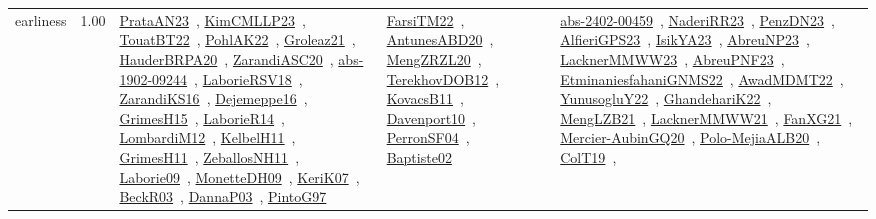 {\begin{longtable}{p{3cm}r>{\raggedright\arraybackslash}p{6cm}>{\raggedright\arraybackslash}p{6cm}>{\raggedright\arraybackslash}p{8cm}}
\index{earliness}\index{Concepts!earliness}earliness &  1.00 & \href{../works/PrataAN23.pdf}{PrataAN23}~\cite{PrataAN23}, \href{../works/KimCMLLP23.pdf}{KimCMLLP23}~\cite{KimCMLLP23}, \href{../works/TouatBT22.pdf}{TouatBT22}~\cite{TouatBT22}, \href{../works/PohlAK22.pdf}{PohlAK22}~\cite{PohlAK22}, \href{../works/Groleaz21.pdf}{Groleaz21}~\cite{Groleaz21}, \href{../works/HauderBRPA20.pdf}{HauderBRPA20}~\cite{HauderBRPA20}, \href{../works/ZarandiASC20.pdf}{ZarandiASC20}~\cite{ZarandiASC20}, \href{../works/abs-1902-09244.pdf}{abs-1902-09244}~\cite{abs-1902-09244}, \href{../works/LaborieRSV18.pdf}{LaborieRSV18}~\cite{LaborieRSV18}, \href{../works/ZarandiKS16.pdf}{ZarandiKS16}~\cite{ZarandiKS16}, \href{../works/Dejemeppe16.pdf}{Dejemeppe16}~\cite{Dejemeppe16}, \href{../works/GrimesH15.pdf}{GrimesH15}~\cite{GrimesH15}, \href{../works/LaborieR14.pdf}{LaborieR14}~\cite{LaborieR14}, \href{../works/LombardiM12.pdf}{LombardiM12}~\cite{LombardiM12}, \href{../works/KelbelH11.pdf}{KelbelH11}~\cite{KelbelH11}, \href{../works/GrimesH11.pdf}{GrimesH11}~\cite{GrimesH11}, \href{../works/ZeballosNH11.pdf}{ZeballosNH11}~\cite{ZeballosNH11}, \href{../works/Laborie09.pdf}{Laborie09}~\cite{Laborie09}, \href{../works/MonetteDH09.pdf}{MonetteDH09}~\cite{MonetteDH09}, \href{../works/KeriK07.pdf}{KeriK07}~\cite{KeriK07}, \href{../works/BeckR03.pdf}{BeckR03}~\cite{BeckR03}, \href{../works/DannaP03.pdf}{DannaP03}~\cite{DannaP03}, \href{../works/PintoG97.pdf}{PintoG97}~\cite{PintoG97} & \href{../works/FarsiTM22.pdf}{FarsiTM22}~\cite{FarsiTM22}, \href{../works/AntunesABD20.pdf}{AntunesABD20}~\cite{AntunesABD20}, \href{../works/MengZRZL20.pdf}{MengZRZL20}~\cite{MengZRZL20}, \href{../works/TerekhovDOB12.pdf}{TerekhovDOB12}~\cite{TerekhovDOB12}, \href{../works/KovacsB11.pdf}{KovacsB11}~\cite{KovacsB11}, \href{../works/Davenport10.pdf}{Davenport10}~\cite{Davenport10}, \href{../works/PerronSF04.pdf}{PerronSF04}~\cite{PerronSF04}, \href{../works/Baptiste02.pdf}{Baptiste02}~\cite{Baptiste02} & \href{../works/abs-2402-00459.pdf}{abs-2402-00459}~\cite{abs-2402-00459}, \href{../works/NaderiRR23.pdf}{NaderiRR23}~\cite{NaderiRR23}, \href{../works/PenzDN23.pdf}{PenzDN23}~\cite{PenzDN23}, \href{../works/AlfieriGPS23.pdf}{AlfieriGPS23}~\cite{AlfieriGPS23}, \href{../works/IsikYA23.pdf}{IsikYA23}~\cite{IsikYA23}, \href{../works/AbreuNP23.pdf}{AbreuNP23}~\cite{AbreuNP23}, \href{../works/LacknerMMWW23.pdf}{LacknerMMWW23}~\cite{LacknerMMWW23}, \href{../works/AbreuPNF23.pdf}{AbreuPNF23}~\cite{AbreuPNF23}, \href{../works/EtminaniesfahaniGNMS22.pdf}{EtminaniesfahaniGNMS22}~\cite{EtminaniesfahaniGNMS22}, \href{../works/AwadMDMT22.pdf}{AwadMDMT22}~\cite{AwadMDMT22}, \href{../works/YunusogluY22.pdf}{YunusogluY22}~\cite{YunusogluY22}, \href{../works/GhandehariK22.pdf}{GhandehariK22}~\cite{GhandehariK22}, \href{../works/MengLZB21.pdf}{MengLZB21}~\cite{MengLZB21}, \href{../works/LacknerMMWW21.pdf}{LacknerMMWW21}~\cite{LacknerMMWW21}, \href{../works/FanXG21.pdf}{FanXG21}~\cite{FanXG21}, \href{../works/Mercier-AubinGQ20.pdf}{Mercier-AubinGQ20}~\cite{Mercier-AubinGQ20}, \href{../works/Polo-MejiaALB20.pdf}{Polo-MejiaALB20}~\cite{Polo-MejiaALB20}, \href{../works/ColT19.pdf}{ColT19}~\cite{ColT19}, 
\end{longtable}}
